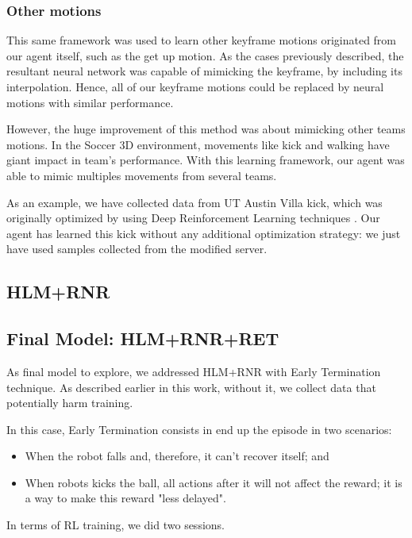 \subsubsection{Other motions}

This same framework was used to learn other keyframe motions originated from our agent itself, such as the get up motion. As the cases previously described, the resultant neural network was capable of mimicking the keyframe, by including its interpolation. Hence, all of our keyframe motions could be replaced by neural motions with similar performance.

However, the huge improvement of this method was about mimicking other teams motions. In the Soccer 3D environment, movements like kick and walking have giant impact in team's performance. With this learning framework, our agent was able to mimic multiples movements from several teams.

As an example, we have collected data from UT Austin Villa kick, which was originally optimized by using Deep Reinforcement Learning techniques \cite{mcalpine2017}. Our agent has learned this kick without any additional optimization strategy: we just have used samples collected from the modified server.


\subsection{HLM+RNR}


\subsection{Final Model: HLM+RNR+RET}\label{sec:hlmrnrret}
As final model to explore, we addressed HLM+RNR with Early Termination technique. As described earlier in this work, without it, we collect data that potentially harm training.

In this case, Early Termination consists in end up the episode in two scenarios:

\begin{itemize}
	\item When the robot falls and, therefore, it can't recover itself; and
	\item When robots kicks the ball, all actions after it will not affect the reward; it is a way to make this reward "less delayed".
\end{itemize}

In terms of RL training, we did two sessions.

